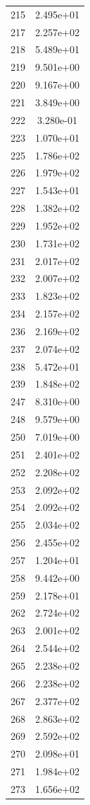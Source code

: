 \documentclass[12pt]{article}
\begin{document}
\begin{longtable}{@{}cc@{}}
215 & 2.495e+01 \\
217 & 2.257e+02 \\
218 & 5.489e+01 \\
219 & 9.501e+00 \\
220 & 9.167e+00 \\
221 & 3.849e+00 \\
222 & 3.280e-01 \\
223 & 1.070e+01 \\
225 & 1.786e+02 \\
226 & 1.979e+02 \\
227 & 1.543e+01 \\
228 & 1.382e+02 \\
229 & 1.952e+02 \\
230 & 1.731e+02 \\
231 & 2.017e+02 \\
232 & 2.007e+02 \\
233 & 1.823e+02 \\
234 & 2.157e+02 \\
236 & 2.169e+02 \\
237 & 2.074e+02 \\
238 & 5.472e+01 \\
239 & 1.848e+02 \\
247 & 8.310e+00 \\
248 & 9.579e+00 \\
250 & 7.019e+00 \\
251 & 2.401e+02 \\
252 & 2.208e+02 \\
253 & 2.092e+02 \\
254 & 2.092e+02 \\
255 & 2.034e+02 \\
256 & 2.455e+02 \\
257 & 1.204e+01 \\
258 & 9.442e+00 \\
259 & 2.178e+01 \\
262 & 2.724e+02 \\
263 & 2.001e+02 \\
264 & 2.544e+02 \\
265 & 2.238e+02 \\
266 & 2.238e+02 \\
267 & 2.377e+02 \\
268 & 2.863e+02 \\
269 & 2.592e+02 \\
270 & 2.098e+01 \\
271 & 1.984e+02 \\
273 & 1.656e+02 \\

\end{longtable}
\end{document}
